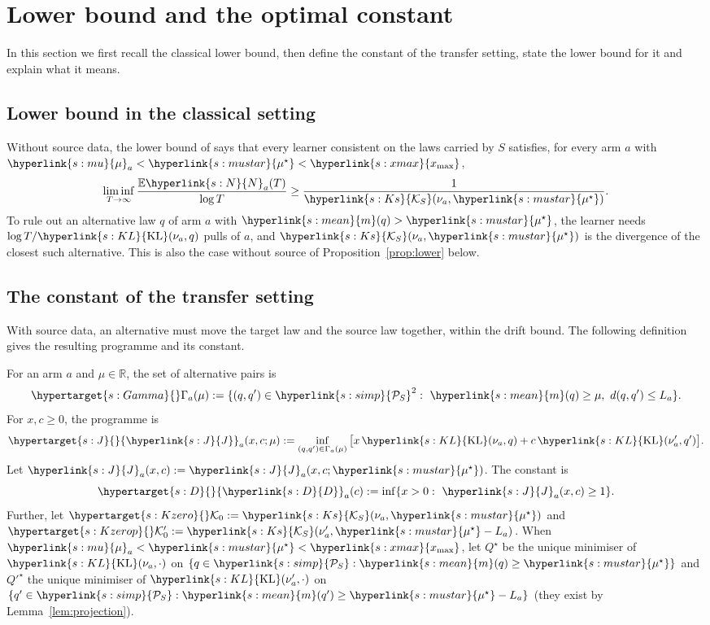 \documentclass[11pt]{article}
\newcommand{\E}{\mathbb{E}}
\newcommand{\dt}[1]{\hypertarget{#1}{}}
\newcommand{\sy}[2]{{\hyperlink{#1}{#2}}}
\newcommand{\xmax}{\sy{s:xmax}{x_{\max}}}
\newcommand{\Simp}{\sy{s:simp}{\mathcal{P}_{S}}}
\newcommand{\mean}{\sy{s:mean}{m}}
\newcommand{\KL}{\sy{s:KL}{\mathrm{KL}}}
\newcommand{\Ks}{\sy{s:Ks}{\mathcal{K}_{S}}}
\newcommand{\mk}{\sy{s:mu}{\mu}}
\newcommand{\mus}{\sy{s:mustar}{\mu^{\star}}}
\newcommand{\Nc}{\sy{s:N}{N}}
\newcommand{\Jf}{\sy{s:J}{J}}
\newcommand{\Dc}{\sy{s:D}{D}}
\begin{document}
\section{Lower bound and the optimal constant}\label{sec:lower}

In this section we first recall the classical lower bound, then define the constant of the transfer
setting, state the lower bound for it and explain what it means.

\subsection{Lower bound in the classical setting}

Without source data, the lower bound of \citet{BK96} says that every
learner consistent on the laws carried by $S$ satisfies, for every arm $a$ with $\mk_a<\mus<\xmax$,
\begin{equation*}
\liminf_{T\to\infty}\frac{\E \Nc_a(T)}{\log T}\ge\frac{1}{\Ks(\nu_a,\mus)}.
\end{equation*}
To rule out an alternative law $q$ of arm $a$ with $\mean(q)>\mus$, the learner needs
$\log T/\KL(\nu_a,q)$ pulls of $a$, and $\Ks(\nu_a,\mus)$ is the divergence of the closest such
alternative. This is also the case without source of Proposition~\ref{prop:lower} below.

\subsection{The constant of the transfer setting}

With source data, an alternative must move the target law and the source law together, within the
drift bound. The following definition gives the resulting programme and its constant.

\begin{definition}\label{def:constant}
For an arm $a$ and $\mu\in\mathbb R$, the set of alternative pairs is
\begin{equation*}
\dt{s:Gamma}\Gamma_a(\mu):=\{(q,q')\in\Simp^2:\ \mean(q)\ge\mu,\ d(q,q')\le L_a\}.
\end{equation*}
For $x,c\ge0$, the programme is
\begin{equation*}
\dt{s:J}\Jf_a(x,c;\mu):=\inf_{(q,q')\in\Gamma_a(\mu)}\big[x\,\KL(\nu_a,q)+c\,\KL(\nu'_a,q')\big].
\end{equation*}
Let $\Jf_a(x,c):=\Jf_a(x,c;\mus)$. The constant is
\begin{equation*}
\dt{s:D}\Dc_a(c):=\inf\{x>0:\ \Jf_a(x,c)\ge1\}.
\end{equation*}
Further, let $\dt{s:Kzero}\mathcal K_0:=\Ks(\nu_a,\mus)$ and
$\dt{s:Kzerop}\mathcal K'_0:=\Ks(\nu'_a,\mus-L_a)$. When $\mk_a<\mus<\xmax$, let
\dt{s:Qs}$Q^\star$ be the unique minimiser of $\KL(\nu_a,\cdot)$ on $\{q\in\Simp:\mean(q)\ge\mus\}$
and \dt{s:Qps}$Q'^\star$ the unique minimiser of $\KL(\nu'_a,\cdot)$ on
$\{q'\in\Simp:\mean(q')\ge\mus-L_a\}$ (they exist by Lemma~\ref{lem:projection}).
\end{definition}
\end{document}
